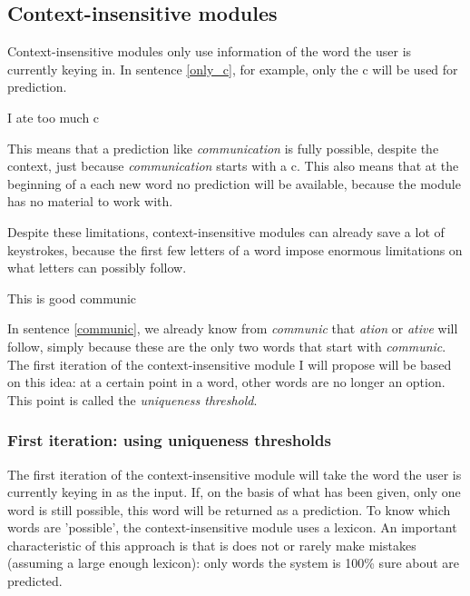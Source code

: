 \documentclass[12pt]{article}
\begin{document}

\subsection{Context-insensitive modules} \label{ci}

Context-insensitive modules only use information of the word the user is currently keying in. In sentence \ref{only_c}, for example, only the c will be used for prediction. 

\begin{examples}
\item I ate too much c \label{only_c}
\end{examples}

This means that a prediction like \emph{communication} is fully possible, despite the context, just because \emph{communication} starts with a c. This also means that at the beginning of a each new word no prediction will be available, because the module has no material to work with.

Despite these limitations, context-insensitive modules can already save a lot of keystrokes, because the first few letters of a word impose enormous limitations on what letters can possibly follow.

\begin{examples}
\item This is good communic \label{communic}
\end{examples}

In sentence \ref{communic}, we already know from \emph{communic} that \emph{ation} or \emph{ative} will follow, simply because these are the only two words that start with \emph{communic}. The first iteration of the context-insensitive module I will propose will be based on this idea: at a certain point in a word, other words are no longer an option. This point is called the \emph{uniqueness threshold}.

\subsubsection{First iteration: using uniqueness thresholds}

The first iteration of the context-insensitive module will take the word the user is currently keying in as the input. If, on the basis of what has been given, only one word is still possible, this word will be returned as a prediction. To know which words are 'possible', the context-insensitive module uses a lexicon. An important characteristic of this approach is that is does not or rarely make mistakes (assuming a large enough lexicon): only words the system is 100\% sure about are predicted.
\end{document}
